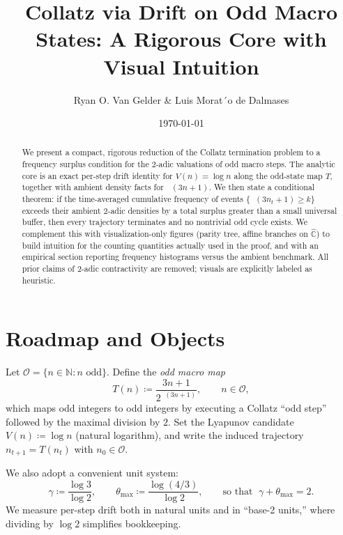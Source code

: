 \documentclass[11pt]{article}
\title{Collatz via Drift on Odd Macro States: A Rigorous Core with Visual Intuition}
\author{Ryan O. Van Gelder \& Luis Morat´o de Dalmases}
\date{\today}
\theoremstyle{plain}
\theoremstyle{definition}
\theoremstyle{remark}
\DeclareMathOperator{\vtwo}{v_2}
\newcommand{\N}{\mathbb{N}}
\newcommand{\Odd}{\mathcal{O}} %
\newcommand{\Todd}{T} %
\newcommand{\V}{V}
\newcommand{\1}{\mathbf{1}}
\begin{document}
\maketitle

 
\begin{abstract}
We present a compact, rigorous reduction of the Collatz termination problem to a frequency surplus condition for the $2$-adic valuations of odd macro steps. The analytic core is an exact per-step drift identity for $\V(n)=\log n$ along the odd-state map $\Todd$, together with ambient density facts for $\vtwo(3n+1)$. We then state a conditional theorem: if the time-averaged cumulative frequency of events $\{\vtwo(3n_t+1)\ge k\}$ exceeds their ambient $2$-adic densities by a total surplus greater than a small universal buffer, then every trajectory terminates and no nontrivial odd cycle exists. We complement this with visualization-only figures (parity tree, affine branches on $\hat{\mathbb C}$) to build intuition for the counting quantities actually used in the proof, and with an empirical section reporting frequency histograms versus the ambient benchmark. All prior claims of $2$-adic contractivity are removed; visuals are explicitly labeled as heuristic.
\end{abstract}

\section{Roadmap and Objects}
Let $\Odd=\{n\in\N: n\text{ odd}\}$. Define the \emph{odd macro map}
\begin{equation}
  \Todd(n) \coloneqq \frac{3n+1}{2^{\vtwo(3n+1)}},\qquad n\in\Odd,
\end{equation}
which maps odd integers to odd integers by executing a Collatz ``odd step'' followed by the maximal division by $2$.
Set the Lyapunov candidate $\V(n)\coloneqq\log n$ (natural logarithm), and write the induced trajectory $n_{t+1}=\Todd(n_t)$ with $n_0\in\Odd$.

We also adopt a convenient unit system:
\begin{equation}
  \gamma \coloneqq \frac{\log 3}{\log 2},\qquad \theta_{\max} \coloneqq \frac{\log(4/3)}{\log 2},\qquad \text{so that }\;\gamma+\theta_{\max}=2.
\end{equation}
We measure per-step drift both in natural units and in ``base-2 units,'' where dividing by $\log 2$ simplifies bookkeeping.
\end{document}
